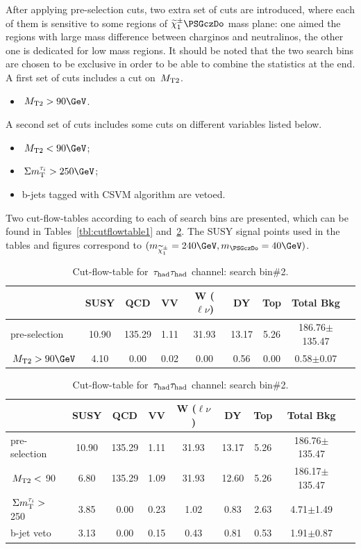 After applying pre-selection cuts, two extra set of cuts are introduced, where each of them is sensitive to some regions of $\chione\PSGczDo$ mass plane: one aimed the regions with large mass difference between charginos and neutralinos, the other one is dedicated for low mass regions. It should be noted that the two search bins are chosen to be exclusive in order to be able to combine the statistics at the end.
A first set of cuts includes a cut on $\,{M_{\rm T2}}$.
\begin{itemize}
\item $\mttwo>90\GeV$.
\end{itemize}
A second set of cuts includes some cuts on different variables listed below.
\begin{itemize}
\item $\mttwo<90\GeV$;
\item $\SumMT>250\GeV$;
\item b-jets tagged with CSVM algorithm are vetoed.
\end{itemize}
Two cut-flow-tables according to each of search bins are presented, which can be found in Tables~\ref{tbl:cutflowtable1} and~\ref{tbl:cutflowtable2}. The SUSY signal points used in the tables and figures correspond to $(m_{\chione}=240\GeV,m_{\PSGczDo}=40\GeV)$.   
\begin{table}
\begin{center}
\begin{tabular}{lcccccccc}
\hline\hline
  &SUSY&QCD&VV&W ($\ell\nu$)&DY&Top&Total Bkg&\\
\hline\hline
pre-selection &10.90&135.29&1.11&31.93&13.17&5.26&186.76$\pm$135.47&\\
$\mttwo>90\GeV$&4.10&0.00&0.02&0.00&0.56&0.00&0.58$\pm$0.07&\\
\hline\hline
\end{tabular}
\caption{Cut-flow-table for $\,\tau_{\rm had}\tau_{\rm had}$ channel: search bin\#1.}
\label{tbl:cutflowtable1}
\begin{tabular}{lcccccccc}
\hline\hline
  &SUSY&QCD&VV&W ($\ell\nu$)&DY&Top&Total Bkg&\\
\hline\hline
pre-selection &10.90&135.29&1.11&31.93&13.17&5.26&186.76$\pm$135.47&\\
$\,{M_{\rm T2}} < $ 90 &6.80&135.29&1.09&31.93&12.60&5.26&186.17$\pm$135.47&\\
$\,\Sigma m_{\rm T}^{\tau_i} > $ 250 &3.85&0.00&0.23&1.02&0.83&2.63&4.71$\pm$1.49&\\
b-jet veto &3.13&0.00&0.15&0.43&0.81&0.53&1.91$\pm$0.87&\\
\hline\hline
\end{tabular}
\caption{Cut-flow-table for $\,\tau_{\rm had}\tau_{\rm had}$ channel: search bin\#2.}
\label{tbl:cutflowtable2}
\end{center}
\end{table}
